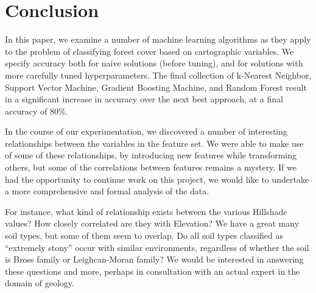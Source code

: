 \section{Conclusion}
\label{sec:-conc}

In this paper, we examine a number of machine learning algorithms as 
they apply to the problem of classifying forest cover based on 
cartographic variables.  We specify accuracy both for naive solutions 
(before tuning), and for solutions with more carefully tuned 
hyperparameters.  The final collection of k-Nearest Neighbor, Support 
Vector Machine, Gradient Boosting Machine, and Random Forest result in 
a significant increase in accuracy over the next best approach, at a 
final accuracy of 80\%.

In the course of our experimentation, we discovered a number of 
interesting relationships between the variables in the feature set.  
We were able to make use of some of these relationships, by introducing 
new features while transforming others, but some of the correlations 
between features remains a mystery. If we had the opportunity to 
continue work on this project, we would like to undertake a more 
comprehensive and formal analysis of the data.  

For instance, what 
kind of relationship exists between the various Hillshade values?  
How closely correlated are they with Elevation?  We have a great 
many soil types, but some of them seem to overlap. Do all soil types 
classified as ``extremely stony'' occur with similar environments, 
regardless of whether the soil is Bross family or Leighcan-Moran family?  
We would be interested in answering these questions and more, perhaps 
in consultation with an actual expert in the domain of geology.





